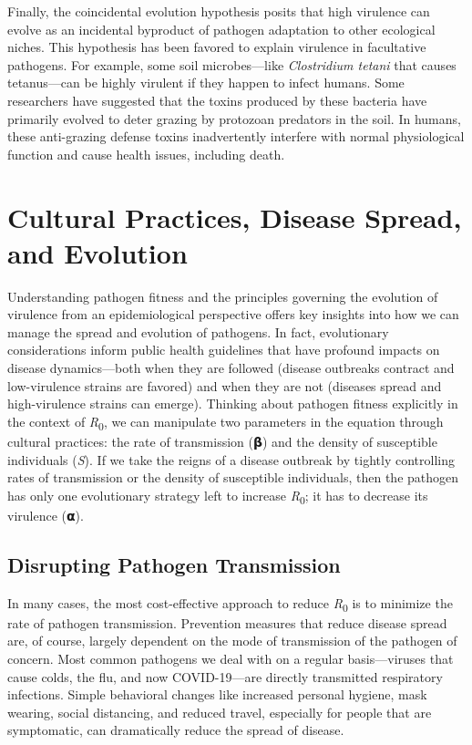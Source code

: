 \documentclass[
]{book}
\begin{document}
Finally, the coincidental evolution hypothesis posits that high virulence can evolve as an incidental byproduct of pathogen adaptation to other ecological niches. This hypothesis has been favored to explain virulence in facultative pathogens. For example, some soil microbes---like \emph{Clostridium tetani} that causes tetanus---can be highly virulent if they happen to infect humans. Some researchers have suggested that the toxins produced by these bacteria have primarily evolved to deter grazing by protozoan predators in the soil. In humans, these anti-grazing defense toxins inadvertently interfere with normal physiological function and cause health issues, including death.

\hypertarget{cultural-practices-disease-spread-and-evolution}{%
\section{Cultural Practices, Disease Spread, and Evolution}\label{cultural-practices-disease-spread-and-evolution}}

Understanding pathogen fitness and the principles governing the evolution of virulence from an epidemiological perspective offers key insights into how we can manage the spread and evolution of pathogens. In fact, evolutionary considerations inform public health guidelines that have profound impacts on disease dynamics---both when they are followed (disease outbreaks contract and low-virulence strains are favored) and when they are not (diseases spread and high-virulence strains can emerge). Thinking about pathogen fitness explicitly in the context of \emph{R}\textsubscript{0}, we can manipulate two parameters in the equation through cultural practices: the rate of transmission (𝝱) and the density of susceptible individuals (\emph{S}). If we take the reigns of a disease outbreak by tightly controlling rates of transmission or the density of susceptible individuals, then the pathogen has only one evolutionary strategy left to increase \emph{R}\textsubscript{0}; it has to decrease its virulence (𝝰).

\hypertarget{disrupting-pathogen-transmission}{%
\subsection{Disrupting Pathogen Transmission}\label{disrupting-pathogen-transmission}}

In many cases, the most cost-effective approach to reduce \emph{R}\textsubscript{0} is to minimize the rate of pathogen transmission. Prevention measures that reduce disease spread are, of course, largely dependent on the mode of transmission of the pathogen of concern. Most common pathogens we deal with on a regular basis---viruses that cause colds, the flu, and now COVID-19---are directly transmitted respiratory infections. Simple behavioral changes like increased personal hygiene, mask wearing, social distancing, and reduced travel, especially for people that are symptomatic, can dramatically reduce the spread of disease.
\end{document}
